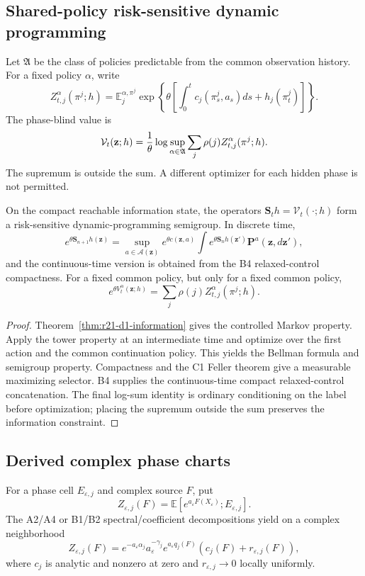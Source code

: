 \subsection{Shared-policy risk-sensitive dynamic programming}

Let $\mathfrak A$ be the class of policies predictable from the common
observation history.  For a fixed policy $\alpha$, write
\[
 Z_{t,j}^{\alpha}(\pi^j;h)=
 \mathbb E_j^{\alpha,\pi^j}
 \exp\left\{\theta\left[
  \int_0^tc_j(\pi_s^j,a_s)ds+h_j(\pi_t^j)
 \right]\right\}.
\]
The phase-blind value is
\[
 \mathcal V_t(\mathbf z;h)=
 {1\over\theta}\log
 \sup_{\alpha\in\mathfrak A}
 \sum_j\rho(j)Z_{t,j}^{\alpha}(\pi^j;h).
\]
The supremum is outside the sum.  A different optimizer for each hidden phase
is not permitted.

\begin{theorem}
\label{thm:r21-d1-semigroup}
On the compact reachable information state, the operators
$\mathbf S_t h=\mathcal V_t(\cdot;h)$ form a risk-sensitive dynamic-programming
semigroup.  In discrete time,
\[
 e^{\theta\mathbf S_{n+1}h(\mathbf z)}
 =\sup_{a\in\mathcal A(\mathbf z)}
 e^{\theta c(\mathbf z,a)}
 \int e^{\theta\mathbf S_nh(\mathbf z')}
       \mathbf P^a(\mathbf z,d\mathbf z'),
\]
and the continuous-time version is obtained from the B4 relaxed-control
compactness.  For a fixed common policy, but only for a fixed common policy,
\[
 e^{\theta V_t^\alpha(\mathbf z;h)}
 =\sum_j\rho(j)Z_{t,j}^{\alpha}(\pi^j;h).
\]
\end{theorem}

\begin{proof}
Theorem~\ref{thm:r21-d1-information} gives the controlled Markov property.
Apply the tower property at an intermediate time and optimize over the first
action and the common continuation policy.  This yields the Bellman formula
and semigroup property.  Compactness and the C1 Feller theorem give a
measurable maximizing selector.  B4 supplies the continuous-time compact
relaxed-control concatenation.  The final log-sum identity is ordinary
conditioning on the label before optimization; placing the supremum outside
the sum preserves the information constraint.
\end{proof}

\subsection{Derived complex phase charts}

For a phase cell $E_{\varepsilon,j}$ and complex source $F$, put
\[
 Z_{\varepsilon,j}(F)=
 \mathbb E[e^{a_\varepsilon F(X_\varepsilon)};
           E_{\varepsilon,j}].
\]
The A2/A4 or B1/B2 spectral/coefficient decompositions yield on a complex
neighborhood
\[
 Z_{\varepsilon,j}(F)=
 e^{-a_\varepsilon\alpha_j}
 a_\varepsilon^{-\gamma_j}
 e^{a_\varepsilon q_j(F)}
 \left(c_j(F)+r_{\varepsilon,j}(F)\right),
\]
where $c_j$ is analytic and nonzero at zero and
$r_{\varepsilon,j}\to0$ locally uniformly.

